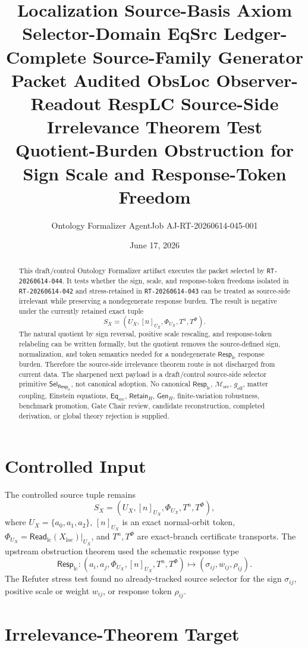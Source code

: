 \documentclass[11pt]{article}
\title{\textbf{Localization Source-Basis Axiom Selector-Domain EqSrc Ledger-Complete Source-Family Generator Packet Audited ObsLoc Observer-Readout RespLC Source-Side Irrelevance Theorem Test}\\[0.35em]
\large Quotient-Burden Obstruction for Sign Scale and Response-Token Freedom}
\author{Ontology Formalizer AgentJob AJ-RT-20260614-045-001}
\date{June 17, 2026}
\newcommand{\EqSrc}{\mathsf{Eq}_{\mathrm{src}}}
\newcommand{\ReadLC}{\mathsf{Read}_{\mathrm{lc}}}
\newcommand{\RetainH}{\mathsf{Retain}_{H}}
\newcommand{\GenH}{\mathsf{Gen}_{H}}
\newcommand{\Msrc}{\mathcal{M}_{\mathrm{src}}}
\newcommand{\RespLC}{\mathsf{Resp}_{\mathrm{lc}}}
\newcommand{\geff}{g_{\mathrm{eff}}}
\newcommand{\SelResp}{\mathsf{Sel}_{\RespLC}}
\begin{document}
\maketitle

\begin{abstract}
This draft/control Ontology Formalizer artifact executes the packet
selected by \texttt{RT-20260614-044}. It tests whether the sign,
scale, and response-token freedoms isolated in \texttt{RT-20260614-042}
and stress-retained in \texttt{RT-20260614-043} can be treated as
source-side irrelevant while preserving a nondegenerate response
burden. The result is negative under the currently retained exact
tuple
\[
    S_X=(U_X,[n]_{U_X},\Phi_{U_X},T^n,T^\Phi).
\]
The natural quotient by sign reversal, positive scale rescaling, and
response-token relabeling can be written formally, but the quotient
removes the source-defined sign, normalization, and token semantics
needed for a nondegenerate \(\RespLC\) response burden. Therefore the
source-side irrelevance theorem route is not discharged from current
data. The sharpened next payload is a draft/control source-side
selector primitive \(\SelResp\), not canonical adoption. No canonical
\(\RespLC\), \(\Msrc\), \(\geff\), matter coupling, Einstein
equations, \(\EqSrc\), \(\RetainH\), \(\GenH\), finite-variation
robustness, benchmark promotion, Gate Chair review, candidate
reconstruction, completed derivation, or global theory rejection is
supplied.
\end{abstract}

\section{Controlled Input}

The controlled source tuple remains
\[
    S_X=(U_X,[n]_{U_X},\Phi_{U_X},T^n,T^\Phi),
\]
where \(U_X=\{a_0,a_1,a_2\}\), \([n]_{U_X}\) is an exact
normal-orbit token, \(\Phi_{U_X}=\ReadLC(X_{\mathrm{loc}})|_{U_X}\),
and \(T^n,T^\Phi\) are exact-branch certificate transports. The
upstream obstruction theorem used the schematic response type
\[
    \RespLC:
    (a_i,a_j,\Phi_{U_X},[n]_{U_X},T^n,T^\Phi)
    \longmapsto
    (\sigma_{ij},w_{ij},\rho_{ij}).
\]
The Refuter stress test found no already-tracked source selector for
the sign \(\sigma_{ij}\), positive scale or weight \(w_{ij}\), or
response token \(\rho_{ij}\).

\section{Irrelevance-Theorem Target}
\end{document}
